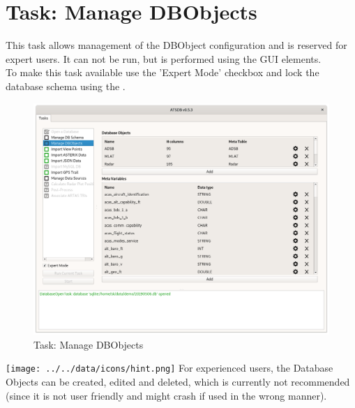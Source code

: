 \section{Task: Manage DBObjects}
\label{sec:manage_dbobjects}

This task allows management of the DBObject configuration and is reserved for expert users. It can not be run, but is performed using the GUI elements. \\

To make this task available use the 'Expert Mode' checkbox and lock the database schema using the .

\begin{figure}[H]
  \hspace*{-2.5cm}
    \includegraphics[width=19cm]{figures/task_manage_dbo.png}
  \caption{Task: Manage DBObjects}
\end{figure}


\texttt{[image: ../../data/icons/hint.png]} For experienced users, the Database Objects can be created, edited and deleted, which is currently not recommended (since it is not user friendly and might crash if used in the wrong manner).

 
